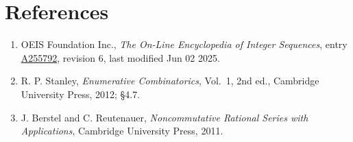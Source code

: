 \documentclass[11pt]{article}
\theoremstyle{definition}
\begin{document}
\section{References}

\begin{enumerate}

\item OEIS Foundation Inc., \emph{The On-Line Encyclopedia of Integer Sequences}, entry \href{https://oeis.org/A255792}{A255792}, revision 6, last modified Jun 02 2025.

\item R. P. Stanley, \emph{Enumerative Combinatorics}, Vol.~1, 2nd ed., Cambridge University Press, 2012; \S4.7.

\item J. Berstel and C. Reutenauer, \emph{Noncommutative Rational Series with Applications}, Cambridge University Press, 2011.

\end{enumerate}
\end{document}
